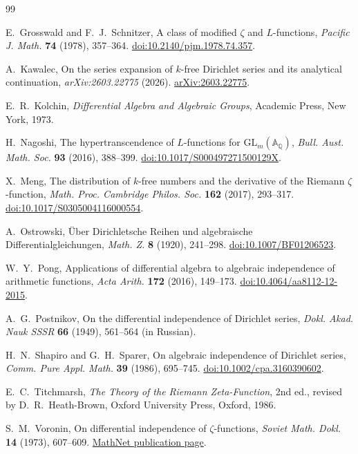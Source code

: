 \documentclass[11pt]{article}
\theoremstyle{definition}
\theoremstyle{remark}
\begin{document}
\begin{thebibliography}{99}

E.~Grosswald and F.~J.~Schnitzer,
\newblock A class of modified \(\zeta\) and \(L\)-functions,
\newblock \emph{Pacific J. Math.} \textbf{74} (1978), 357--364.
\newblock \href{https://doi.org/10.2140/pjm.1978.74.357}
{doi:10.2140/pjm.1978.74.357}.

A.~Kawalec,
\newblock On the series expansion of \(k\)-free Dirichlet series and its analytical continuation,
\newblock \emph{arXiv:2603.22775} (2026).
\newblock \href{https://arxiv.org/abs/2603.22775}{arXiv:2603.22775}.

E.~R.~Kolchin,
\newblock \emph{Differential Algebra and Algebraic Groups},
\newblock Academic Press, New York, 1973.

H.~Nagoshi,
\newblock The hypertranscendence of \(L\)-functions for
\(\mathrm{GL}_m(\mathbb A_{\mathbb Q})\),
\newblock \emph{Bull. Aust. Math. Soc.} \textbf{93} (2016), 388--399.
\newblock \href{https://doi.org/10.1017/S000497271500129X}
{doi:10.1017/S000497271500129X}.

X.~Meng,
\newblock The distribution of \(k\)-free numbers and the derivative of the Riemann
\(\zeta\)-function,
\newblock \emph{Math. Proc. Cambridge Philos. Soc.} \textbf{162} (2017), 293--317.
\newblock \href{https://doi.org/10.1017/S0305004116000554}
{doi:10.1017/S0305004116000554}.

A.~Ostrowski,
\newblock \"Uber Dirichletsche Reihen und algebraische Differentialgleichungen,
\newblock \emph{Math. Z.} \textbf{8} (1920), 241--298.
\newblock \href{https://doi.org/10.1007/BF01206523}
{doi:10.1007/BF01206523}.

W.~Y.~Pong,
\newblock Applications of differential algebra to algebraic independence of arithmetic
functions,
\newblock \emph{Acta Arith.} \textbf{172} (2016), 149--173.
\newblock \href{https://doi.org/10.4064/aa8112-12-2015}
{doi:10.4064/aa8112-12-2015}.

A.~G.~Postnikov,
\newblock On the differential independence of Dirichlet series,
\newblock \emph{Dokl. Akad. Nauk SSSR} \textbf{66} (1949), 561--564
\newblock (in Russian).

H.~N.~Shapiro and G.~H.~Sparer,
\newblock On algebraic independence of Dirichlet series,
\newblock \emph{Comm. Pure Appl. Math.} \textbf{39} (1986), 695--745.
\newblock \href{https://doi.org/10.1002/cpa.3160390602}
{doi:10.1002/cpa.3160390602}.

E.~C.~Titchmarsh,
\newblock \emph{The Theory of the Riemann Zeta-Function}, 2nd ed.,
revised by D.~R.~Heath-Brown,
\newblock Oxford University Press, Oxford, 1986.

S.~M.~Voronin,
\newblock On differential independence of \(\zeta\)-functions,
\newblock \emph{Soviet Math. Dokl.} \textbf{14} (1973), 607--609.
\newblock \href{https://www.mathnet.ru/eng/dan37604}{MathNet publication page}.

\end{thebibliography}
\end{document}

